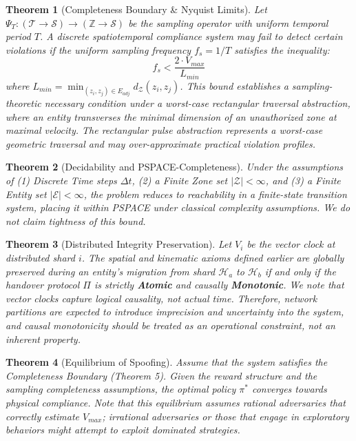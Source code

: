 \documentclass[conference]{IEEEtran}
\newtheorem{theorem}{Theorem}
\newcommand{\E}{\mathcal{E}} %
\newcommand{\Z}{\mathcal{Z}} %
\newcommand{\T}{\mathcal{T}} %
\newcommand{\Sstate}{\mathcal{S}} %
\begin{document}
\begin{theorem}[Completeness Boundary \& Nyquist Limits]
Let $\Psi_T: (\T \to \Sstate) \to (\mathbb{Z} \to \Sstate)$ be the sampling operator with uniform temporal period $T$. A discrete spatiotemporal compliance system may fail to detect certain violations if the uniform sampling frequency $f_s = 1/T$ satisfies the inequality:
\begin{equation}
f_s < \frac{2 \cdot V_{max}}{L_{min}}
\end{equation}
where $L_{min} = \min_{(z_i, z_j) \in E_{adj}} d_\Z(z_i, z_j)$.
\textit{This bound establishes a sampling-theoretic necessary condition under a worst-case rectangular traversal abstraction, where an entity transverses the minimal dimension of an unauthorized zone at maximal velocity. The rectangular pulse abstraction represents a worst-case geometric traversal and may over-approximate practical violation profiles.}
\end{theorem}

\begin{theorem}[Decidability and PSPACE-Completeness]
Under the assumptions of (1) Discrete Time steps $\Delta t$, (2) a Finite Zone set $|\Z| < \infty$, and (3) a Finite Entity set $|\E| < \infty$, the problem reduces to reachability in a finite-state transition system, placing it within PSPACE under classical complexity assumptions. We do not claim tightness of this bound.
\end{theorem}

\begin{theorem}[Distributed Integrity Preservation]
Let $V_i$ be the vector clock at distributed shard $i$. The spatial and kinematic axioms defined earlier are globally preserved during an entity's migration from shard $\mathcal{H}_a$ to $\mathcal{H}_b$ if and only if the handover protocol $\Pi$ is strictly \textbf{Atomic} and causally \textbf{Monotonic}. We note that vector clocks capture logical causality, not actual time. Therefore, network partitions are expected to introduce imprecision and uncertainty into the system, and causal monotonicity should be treated as an operational constraint, not an inherent property.
\end{theorem}

\begin{theorem}[Equilibrium of Spoofing]
Assume that the system satisfies the Completeness Boundary (Theorem 5). Given the reward structure and the sampling completeness assumptions, the optimal policy $\pi^*$ converges towards physical compliance. Note that this equilibrium assumes rational adversaries that correctly estimate $V_{max}$; irrational adversaries or those that engage in exploratory behaviors might attempt to exploit dominated strategies.
\end{theorem}
\end{document}
